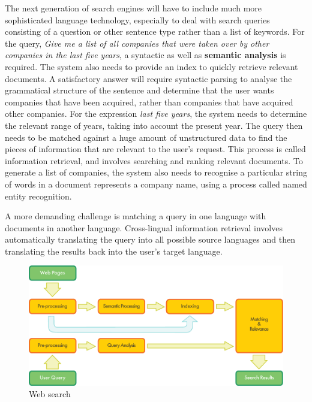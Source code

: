 \documentclass[]{../../metanetpaper}
\begin{document}
\begin{multicols}{2}

The next generation of search engines will have to include much more sophisticated language technology, especially to deal with search queries consisting of a question or other sentence type rather than a list of keywords. For the query, \textit{Give me a list of all companies that were taken over by other companies in the last five years}, a syntactic as well as \textbf{semantic analysis} is required. The system also needs to provide an index to quickly retrieve relevant documents. A satisfactory answer will require syntactic parsing to analyse the grammatical structure of the sentence and determine that the user wants companies that have been acquired, rather than companies that have acquired other companies. For the expression \textit{last five years}, the system needs to determine the relevant range of years, taking into account the present year. The query then needs to be matched against a huge amount of unstructured data to find the pieces of information that are relevant to the user’s request. This process is called information retrieval, and involves searching and ranking relevant documents. To generate a list of companies, the system also needs to recognise a particular string of words in a document represents a company name, using a process called named entity recognition.

A more demanding challenge is matching a query in one language with documents in another language. Cross-lingual information retrieval involves automatically translating the query into all possible source languages and then translating the results back into the user's target language.

\begin{figure}[htb]
  \center
  \includegraphics[width=\textwidth]{../_media/english/web_search_architecture}
  \caption{Web search}
  \label{fig:websearcharch_en}
 \end{figure}


\end{multicols}
\end{document}

